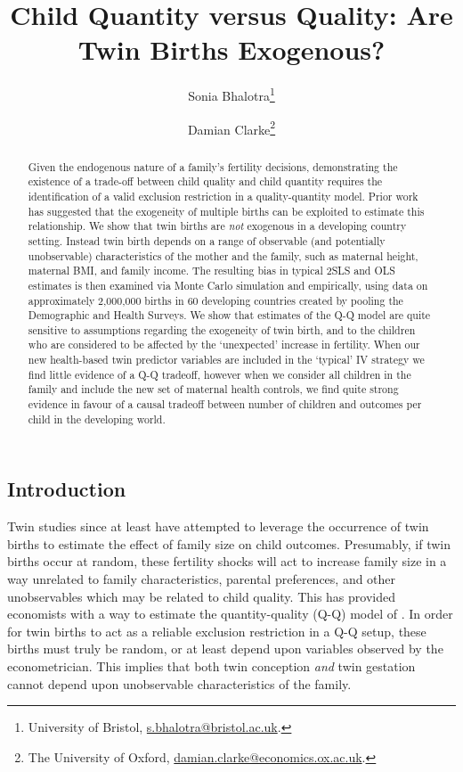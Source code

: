 \documentclass{article}[11pt,subeqn]
\title{Child Quantity versus Quality: Are Twin Births Exogenous?}
\author{Sonia Bhalotra\thanks{University of Bristol, \href{mailto:s.bhalotra@bristol.ac.uk}{s.bhalotra@bristol.ac.uk}.} \and Damian Clarke\thanks{The University of Oxford, \href{mailto:damian.clarke@economics.ox.ac.uk}{damian.clarke@economics.ox.ac.uk}.}}
\begin{document}
\begin{spacing}{1.25}



\maketitle
\end{spacing}
\begin{spacing}{1.5}	

\begin{abstract}
Given the endogenous nature of a family's fertility decisions, demonstrating the existence of a trade-off between child quality and child quantity requires the 
identification of a valid exclusion restriction in a quality-quantity model.  Prior work has suggested that the exogeneity of multiple births can be exploited to 
estimate this relationship.  We show that twin births are \emph{not} exogenous in a developing country setting.  Instead twin birth depends on a range of 
observable (and potentially unobservable) characteristics of the mother and the family, such as maternal height, maternal BMI, and family income.  The resulting bias 
in typical 2SLS and OLS estimates 
is then examined via Monte Carlo simulation and empirically, using data on approximately 2,000,000 births in 60 developing countries created by pooling the Demographic
and Health Surveys.  We show that estimates of the Q-Q model are quite sensitive to assumptions regarding the exogeneity of twin birth, and to the children who are
considered to be affected by the `unexpected' increase in fertility.  When our new health-based twin predictor variables are included in the `typical'
IV strategy we find little evidence of a Q-Q tradeoff, however when we consider all children in the family and include the new set of maternal health controls, we find 
quite strong evidence in favour of a causal tradeoff between number of children and outcomes per child in the developing world.

\end{abstract}
\newpage

\section{Introduction}
\label{scn:intro}
Twin studies since at least \citet{RosenzweigWolpin1980} have attempted to leverage the occurrence of twin births to estimate the effect of family size on
child outcomes.  Presumably, if twin births occur at random, these fertility shocks will act to increase family size in a way unrelated to family characteristics,
parental preferences, and other unobservables which may be related to child quality.  This has provided economists with a way to estimate the quantity-quality
(Q-Q) model of \citet{BeckerLewis1973}.  In order for twin births to act as a reliable exclusion restriction in a Q-Q setup, these births must truly be random, 
or at least depend upon variables observed by the econometrician.  This implies that both twin conception \emph{and} twin gestation cannot depend upon unobservable 
characteristics of the family.


\end{spacing}
\end{document}
